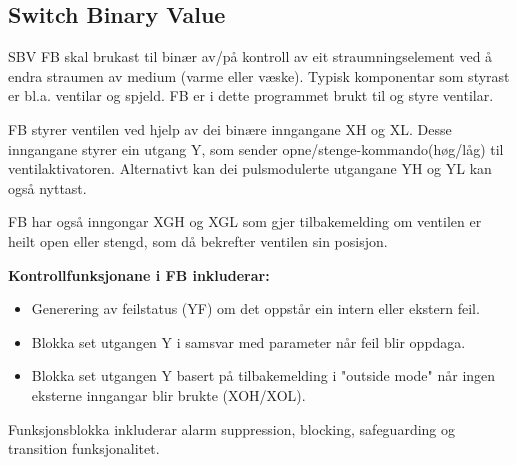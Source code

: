 \newpage

\subsection{Switch Binary Value}

\gls{SBV} \gls{FB} skal brukast til binær av/på kontroll av eit straumningselement ved å endra straumen av medium (varme eller væske). 
Typisk komponentar som styrast er bl.a. ventilar og spjeld.
\gls{FB} er i dette programmet brukt til og styre ventilar.

\gls{FB} styrer ventilen ved hjelp av dei binære inngangane XH og XL.
Desse inngangane styrer ein utgang Y, som sender opne/stenge-kommando(høg/låg) til ventilaktivatoren.
Alternativt kan dei pulsmodulerte utgangane YH og YL kan også nyttast.

\gls{FB} har også inngongar XGH og XGL som gjer tilbakemelding om ventilen er heilt open eller stengd,
som då bekrefter ventilen sin posisjon.

\textbf{Kontrollfunksjonane i \gls{FB} inkluderar:}
\begin{itemize}
    \item Generering av feilstatus (YF) om det oppstår ein intern eller ekstern feil.
    \item Blokka set utgangen Y i samsvar med parameter når feil blir oppdaga.
    \item Blokka set utgangen Y basert på tilbakemelding i "outside mode" når ingen eksterne inngangar blir brukte (XOH/XOL).
\end{itemize}

Funksjonsblokka inkluderar alarm suppression, blocking, safeguarding og transition funksjonalitet.

